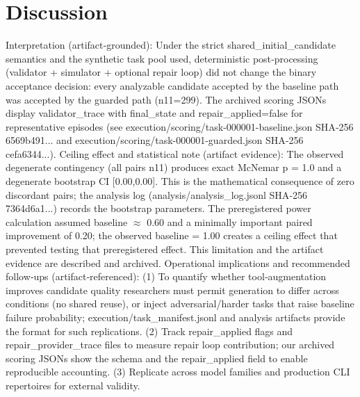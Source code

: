 \documentclass[conference]{IEEEtran}
\begin{document}
\section{Discussion}
Interpretation (artifact‑grounded): Under the strict shared\_initial\_candidate semantics and the synthetic task pool used, deterministic post‑processing (validator + simulator + optional repair loop) did not change the binary acceptance decision: every analyzable candidate accepted by the baseline path was accepted by the guarded path (n11=299). The archived scoring JSONs display validator\_trace with final\_state and repair\_applied=false for representative episodes (see execution/scoring/task-000001-baseline.json SHA‑256 6569b491... and execution/scoring/task-000001-guarded.json SHA‑256 cefa6344...).
Ceiling effect and statistical note (artifact evidence): The observed degenerate contingency (all pairs n11) produces exact McNemar p = 1.0 and a degenerate bootstrap CI [0.00,0.00]. This is the mathematical consequence of zero discordant pairs; the analysis log (analysis/analysis\_log.jsonl SHA‑256 7364d6a1...) records the bootstrap parameters. The preregistered power calculation assumed baseline \ensuremath{\approx} 0.60 and a minimally important paired improvement of 0.20; the observed baseline = 1.00 creates a ceiling effect that prevented testing that preregistered effect. This limitation and the artifact evidence are described and archived.
Operational implications and recommended follow‑ups (artifact‑referenced): (1) To quantify whether tool‑augmentation improves candidate quality researchers must permit generation to differ across conditions (no shared reuse), or inject adversarial/harder tasks that raise baseline failure probability; execution/task\_manifest.jsonl and analysis artifacts provide the format for such replications. (2) Track repair\_applied flags and repair\_provider\_trace files to measure repair loop contribution; our archived scoring JSONs show the schema and the repair\_applied field to enable reproducible accounting. (3) Replicate across model families and production CLI repertoires for external validity.
\end{document}

